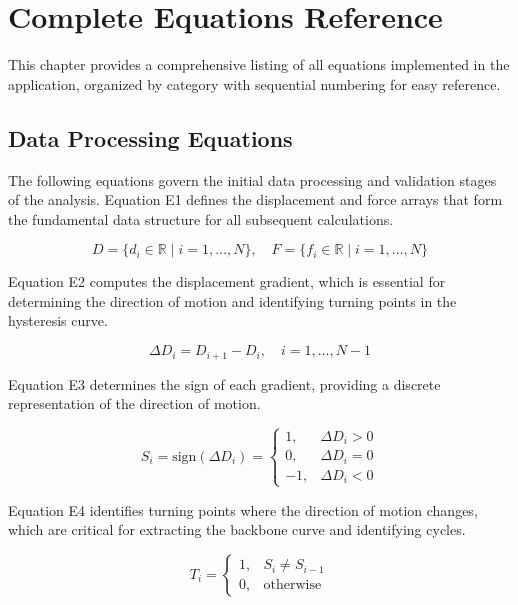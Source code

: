 \documentclass[11pt,a4paper]{article}
\begin{document}
\section{Complete Equations Reference}

This chapter provides a comprehensive listing of all equations implemented in the application, organized by category with sequential numbering for easy reference.

\subsection{Data Processing Equations}

The following equations govern the initial data processing and validation stages of the analysis. Equation E1 defines the displacement and force arrays that form the fundamental data structure for all subsequent calculations.

\begin{equation}
D = \{d_i \in \mathbb{R} \mid i = 1, \ldots, N\}, \quad F = \{f_i \in \mathbb{R} \mid i = 1, \ldots, N\}
\tag{E1}
\label{eq:E1}
\end{equation}

Equation E2 computes the displacement gradient, which is essential for determining the direction of motion and identifying turning points in the hysteresis curve.

\begin{equation}
\Delta D_i = D_{i+1} - D_i, \quad i = 1, \ldots, N-1
\tag{E2}
\label{eq:E2}
\end{equation}

Equation E3 determines the sign of each gradient, providing a discrete representation of the direction of motion.

\begin{equation}
S_i = \text{sign}(\Delta D_i) = 
\begin{cases}
1, & \Delta D_i > 0 \\
0, & \Delta D_i = 0 \\
-1, & \Delta D_i < 0
\end{cases}
\tag{E3}
\label{eq:E3}
\end{equation}

Equation E4 identifies turning points where the direction of motion changes, which are critical for extracting the backbone curve and identifying cycles.

\begin{equation}
T_i = 
\begin{cases}
1, & S_i \neq S_{i-1} \\
0, & \text{otherwise}
\end{cases}
\tag{E4}
\label{eq:E4}
\end{equation}
\end{document}
